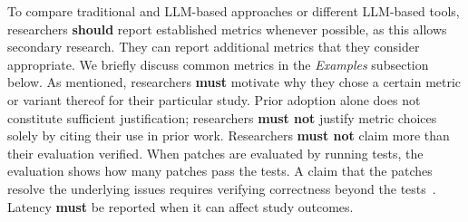 \documentclass[smallextended]{svjour3}
\newcommand{\must}{\textbf{must}\xspace}
\newcommand{\mustnot}{\textbf{must not}\xspace}
\newcommand{\should}{\textbf{should}\xspace}
\begin{document}
To compare traditional and LLM-based approaches or different LLM-based tools, researchers \should report established metrics whenever possible, as this allows secondary research.
They can report additional metrics that they consider appropriate.
We briefly discuss common metrics in the \emph{Examples} subsection below.
As mentioned, researchers \must motivate why they chose a certain metric or variant thereof for their particular study.
Prior adoption alone does not constitute sufficient justification; researchers \mustnot justify metric choices solely by citing their use in prior work.
Researchers \mustnot claim more than their evaluation verified. When patches are evaluated by running tests, the evaluation shows how many patches pass the tests. A claim that the patches resolve the underlying issues requires verifying correctness beyond the tests~\cite{Izadi2026benchmarking}.
Latency \must be reported when it can affect study outcomes.
\end{document}
